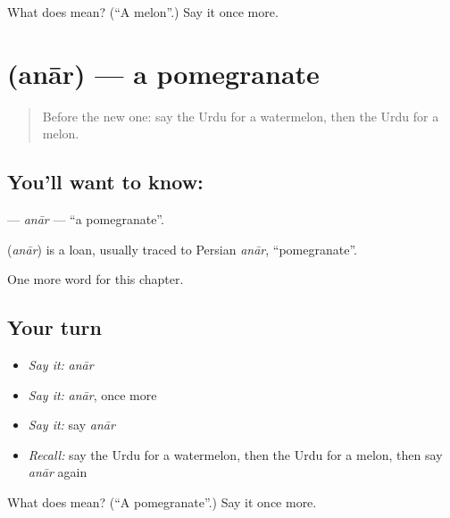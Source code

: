 \begin{tcolorbox}[breakable,colback=teal!4,colframe=teal!35!black,title={Before you move on}]
What does  mean? (\textquotedblleft{}A melon\textquotedblright{}.) Say it once more.
\end{tcolorbox}
\section[\texorpdfstring{\ur{انار} (anār)}{انار (anār)}]{ (anār) — a pomegranate}

\label{lesson:UR-C116-anar}



\begin{quote}
Before the new one: say the Urdu for a watermelon, then the Urdu for a melon.
\end{quote}

\subsection*{You'll want to know: }
\textbf{} — \emph{anār} — \textquotedblleft{}a pomegranate\textquotedblright{}.

\begin{cousinweb}
\textbf{} (\emph{anār}) is a loan, usually traced to Persian \emph{anār}, \textquotedblleft{}pomegranate\textquotedblright{}.
\end{cousinweb}

\begin{grammarlens}[title={What you've built}]
One more word for this chapter.
\end{grammarlens}

\subsection*{Your turn}
\begin{itemize}
\raggedright
  \item \emph{Say it:} \emph{anār}
  \item \emph{Say it:} \emph{anār}, once more
  \item \emph{Say it:} say \emph{anār}
  \item \emph{Recall:} say the Urdu for a watermelon, then the Urdu for a melon, then say \emph{anār} again
\end{itemize}

\begin{tcolorbox}[breakable,colback=teal!4,colframe=teal!35!black,title={Before you move on}]
What does  mean? (\textquotedblleft{}A pomegranate\textquotedblright{}.) Say it once more.
\end{tcolorbox}
